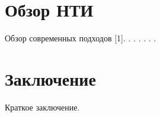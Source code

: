 \documentclass{gostcheck-vkr}
\begin{document}
\section{Обзор НТИ}
Обзор современных подходов [1].
\cite{foreign01, foreign02, foreign03, foreign04}.
\cite{foreign05, foreign06, foreign07, foreign08}.
\cite{foreign09, foreign10, foreign11, foreign12}.
\cite{ru01, ru02, ru03, ru04}.
\cite{ru05, ru06, ru07, ru08}.
\cite{online01}.
\section{Заключение}
Краткое заключение.
\end{document}
